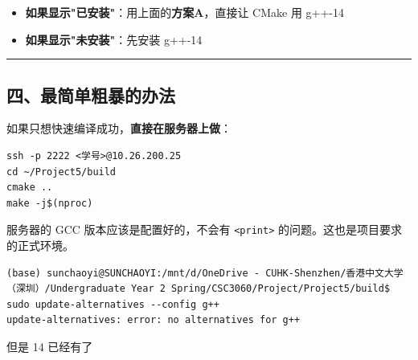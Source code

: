 \documentclass[11pt, a4paper]{article}
\begin{document}
\begin{aibox}
\begin{itemize}
    \item \textbf{如果显示"已安装"}：用上面的\textbf{方案A}，直接让 CMake 用 g++-14
    \item \textbf{如果显示"未安装"}：先安装 g++-14
\end{itemize}

\begin{center}\rule{\textwidth}{0.4pt}\end{center}

\subsection*{四、最简单粗暴的办法}

如果只想快速编译成功，\textbf{直接在服务器上做}：

\begin{tcolorbox}[colback=white,colframe=gray!50!white,boxrule=0.5pt,arc=2pt,left=5pt,right=5pt,top=5pt,bottom=5pt]
\begin{verbatim}
ssh -p 2222 <学号>@10.26.200.25
cd ~/Project5/build
cmake ..
make -j$(nproc)
\end{verbatim}
\end{tcolorbox}

服务器的 GCC 版本应该是配置好的，不会有 \texttt{\textless print\textgreater} 的问题。这也是项目要求的正式环境。
\end{aibox}

\vspace{1.5em}

\begin{userbox}
\begin{verbatim}
(base) sunchaoyi@SUNCHAOYI:/mnt/d/OneDrive - CUHK-Shenzhen/香港中文大学（深圳）/Undergraduate Year 2 Spring/CSC3060/Project/Project5/build$ sudo update-alternatives --config g++
update-alternatives: error: no alternatives for g++
\end{verbatim}
但是 14 已经有了
\end{userbox}
\end{document}
